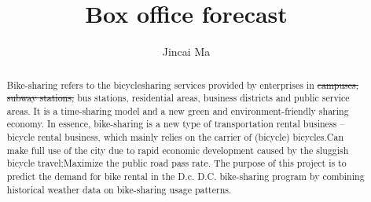 \documentclass{amsart}
\providecommand{\DIFadd}[1]{{\protect\color{blue}\uwave{#1}}} %
\providecommand{\DIFdel}[1]{{\protect\color{red}\sout{#1}}}                      %
\providecommand{\DIFaddbegin}{} %
\providecommand{\DIFaddend}{} %
\providecommand{\DIFdelbegin}{} %
\providecommand{\DIFdelend}{} %
\begin{document}
%
%
\title[A Short Running Title]{ Box office forecast}%

\author{Jincai Ma}
\address[A.~1]{School of Computer Science,\\ 
Xi'an Shiyou University, Shaanxi 710065, China}%


%
\date{\gitAuthorDate}%

\begin{abstract}
    Bike-sharing refers to the bicycle\DIFaddbegin \DIFadd{(bike) }\DIFaddend sharing services provided by enterprises in \DIFdelbegin \DIFdel{campuses, subway stations, }\DIFdelend bus stations, residential areas, business districts and public service areas. It is a time-sharing model and a new green and environment-friendly sharing economy.
In essence, bike-sharing is a new type of transportation rental business -- bicycle rental business, which mainly relies on the carrier of (bicycle) bicycles.Can make full use of the city due to rapid economic development caused by the sluggish bicycle travel;Maximize the public road pass rate.
The purpose of this project is to predict the demand for bike rental in the D.c. D.C. bike-sharing program by combining historical weather data on bike-sharing usage patterns.\\

\end{abstract}

\maketitle
\tableofcontents

\newpage



\newpage




\listoftodos
\end{document}
